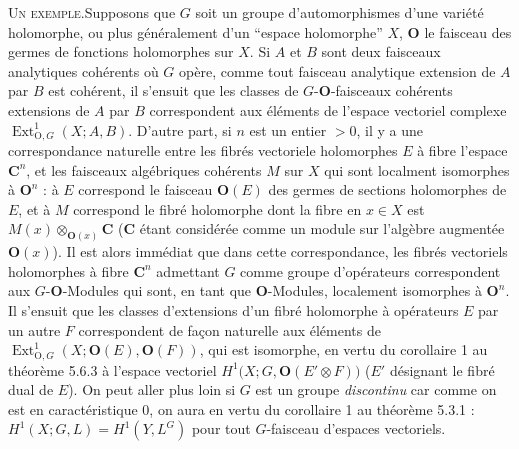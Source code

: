 \clearpage
{}

\textsc{Un exemple.}\quad Supposons que $G$ soit un groupe
d'automorphismes d'une variété holomorphe, ou plus généralement d'un
``espace holomorphe'' $X$, ${\mathbf O}$ le faisceau des germes de fonctions
holomorphes sur $X$.
Si $A$ et $B$ sont deux faisceaux analytiques cohérents où $G$ opère, comme
tout faisceau analytique extension de $A$ par $B$ est cohérent, il s'ensuit
que les classes de $G$-${\mathbf O}$-faisceaux cohérents extensions de $A$ par $B$
correspondent aux éléments de l'espace vectoriel complexe
$\operatorname{Ext}_{{\mathrm O},G}^{1}(X;A,B)$.
D'autre part, si $n$ est un entier $>0$, il y a une correspondance naturelle
entre les fibrés vectoriele holomorphes $E$ à fibre l'espace $\mathbf C^n$, et
les faisceaux algébriques cohérents $M$ sur $X$ qui sont localment isomorphes
à ${\mathbf O}^n$ : à $E$ correspond le faisceau ${\mathbf O}(E)$ des germes de sections
holomorphes de $E$, et à $M$ correspond le fibré holomorphe dont la fibre en
$x\in X$ est $M(x)\otimes_{{\mathbf O}(x)}\mathbf C$ ($\mathbf C$ étant considérée comme
un module sur l'algèbre augmentée ${\mathbf O}(x)$).
Il est alors immédiat que dans cette correspondance, les fibrés vectoriels
holomorphes à fibre $\mathbf C^n$ admettant $G$ comme groupe d'opérateurs
correspondent aux $G$-${\mathbf O}$-Modules qui sont, en tant que ${\mathbf O}$-Modules,
localement isomorphes à ${\mathbf O}^n$.
Il s'ensuit que les classes d'extensions d'un fibré holomorphe à opérateurs
$E$ par un autre $F$ correspondent de façon naturelle aux éléments de
$\operatorname{Ext}_{{\mathrm O},G}^{1}(X;{\mathbf O}(E),{\mathbf O}(F))$, qui est isomorphe, en vertu du
corollaire 1 au théorème 5.6.3 à l'espace vectoriel
$H^1\bigl(X;G,{\mathbf O}(E'\otimes F)\bigr)$
($E'$ désignant le fibré dual de $E$).
On peut aller plus loin si $G$ est un groupe \textit{discontinu} car comme on
est en caractéristique 0, on aura en vertu du corollaire 1 au théorème 5.3.1 :
$H^1(X;G,L)=H^1(Y,L^G)$ pour tout $G$-faisceau d'espaces vectoriels.
